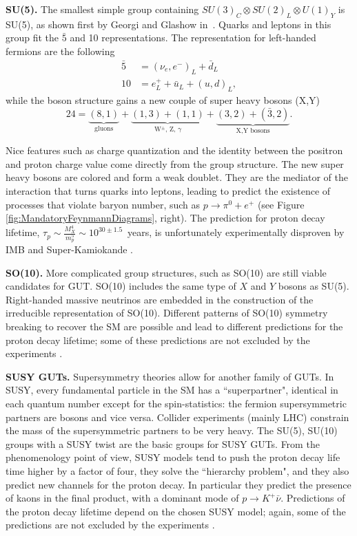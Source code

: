 \textbf{SU(5).} The smallest simple group containing $SU(3)_C  \otimes SU(2)_L \otimes U(1)_Y$ is SU(5), as shown first by Georgi and Glashow in~\cite{PhysRevLett.32.438}. Quarks and leptons in this group fit the $\bar 5$ and 10 representations. The representation for left-handed fermions are the following
\begin{align}
\bar 5 &= (\nu_e, e^-)_L + \bar d_L\\
10 &=  e^+_L  +  \bar u_L  + (u, d)_L ,
\end{align}
while the boson structure gains a new couple of super heavy bosons (X,Y)
\begin{equation}
24 = \underbrace{(8,1)}_{\text{gluons}} + \underbrace{ (1,3) + (1,1)}_{\text{W$^\pm$, Z, $\gamma$}} +  \underbrace{(3,2) + (\bar 3,2)}_{\text{X,Y bosons}}. 
\end{equation}

Nice features such as charge quantization and the identity between the positron and proton charge value come directly from the group structure. 
The new super heavy bosons are colored and form a weak doublet. They are the mediator of the interaction that turns quarks into leptons, leading to predict the existence of processes that violate baryon number, such as $p \rightarrow \pi^0  + e^+$  (see Figure~ \ref{fig:MandatoryFeynmannDiagrams}, right). The prediction for proton decay lifetime, $\tau_p \sim \frac{M^4_X}{m^5_p}\sim10^{30\pm1.5}$~years, is unfortunately experimentally disproven by IMB and Super-Kamiokande \cite{PhysRevD.42.2974,PhysRevD.95.012004}. 

\textbf{SO(10).} More complicated group structures, such as SO(10) are still viable candidates for GUT. SO(10) includes the same type of $X$ and $Y$ bosons as SU(5). Right-handed massive neutrinos are embedded in the construction of the irreducible representation of SO(10). Different patterns of SO(10) symmetry breaking to recover the SM are possible and lead to different predictions for the proton decay lifetime; some of these predictions are not excluded by the experiments \cite{PhysRevD.51.229}.

\textbf{SUSY GUTs.} Supersymmetry theories allow for another family of GUTs. In SUSY, every fundamental particle in the SM has a ``superpartner", identical in each quantum number except for the spin-statistics: the fermion supersymmetric partners are bosons and vice versa. Collider experiments (mainly LHC)  constrain the mass of the supersymmetric partners to be very heavy.
The SU(5), SU(10) groups with a SUSY twist are the basic groups for SUSY GUTs. From the phenomenology point of view, SUSY models tend to push the proton decay life time higher by a factor of four, they solve the ``hierarchy problem", and they also predict new channels for the proton decay. In particular they predict the presence of kaons in the final product, with a dominant mode of $p\rightarrow K^+ \bar\nu$. %
Predictions of the proton decay lifetime depend on the chosen SUSY model; again, some of the predictions are not excluded by the experiments \cite{PhysRevD.55.6986, PhysRevD.67.075007,Lopez:1991eca}.

